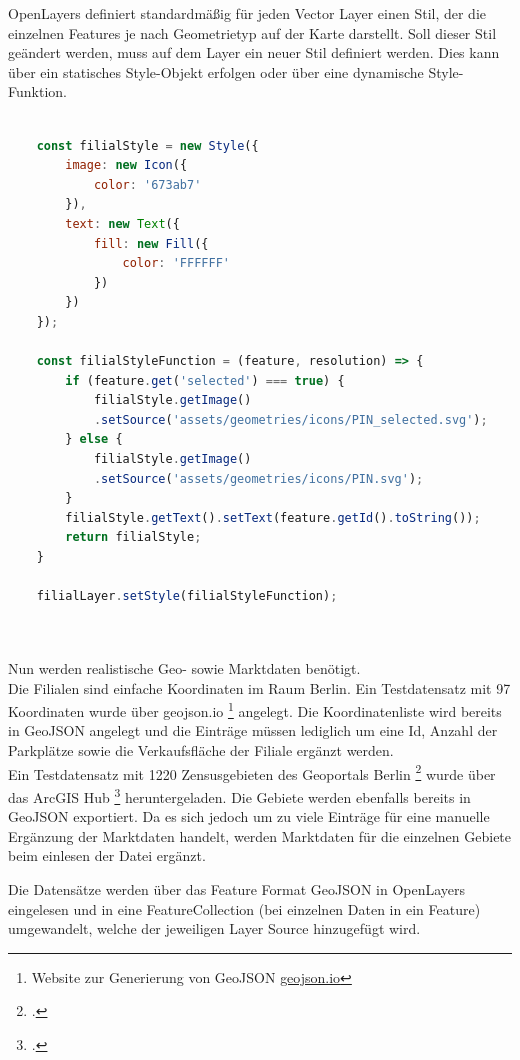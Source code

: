OpenLayers definiert standardmäßig für jeden Vector Layer einen Stil, der die einzelnen Features je nach Geometrietyp auf der Karte darstellt. 
Soll dieser Stil geändert werden, muss auf dem Layer ein neuer Stil definiert werden.
Dies kann über ein statisches Style-Objekt erfolgen oder über eine dynamische Style-Funktion.

\begin{lstlisting}[language=JavaScript, label={code:filialStyle}, caption={Erstellen des Filialstyles}]
	
	const filialStyle = new Style({
		image: new Icon({
			color: '673ab7'
		}),
		text: new Text({
			fill: new Fill({
				color: 'FFFFFF'
			})	
		})
	});
	
	const filialStyleFunction = (feature, resolution) => {
		if (feature.get('selected') === true) {
			filialStyle.getImage()
			.setSource('assets/geometries/icons/PIN_selected.svg');
		} else {
			filialStyle.getImage()
			.setSource('assets/geometries/icons/PIN.svg');
		}
		filialStyle.getText().setText(feature.getId().toString());
		return filialStyle;
	}
	
	filialLayer.setStyle(filialStyleFunction);

	
\end{lstlisting}

Nun werden realistische Geo- sowie Marktdaten benötigt.\\
Die Filialen sind einfache Koordinaten im Raum Berlin.
Ein Testdatensatz mit 97 Koordinaten wurde über geojson.io \footnote{ Website zur Generierung von GeoJSON \href{geojson.io}{geojson.io}} angelegt.
Die Koordinatenliste wird bereits in GeoJSON angelegt und die Einträge müssen lediglich um eine Id, Anzahl der Parkplätze sowie die Verkaufsfläche der Filiale ergänzt werden.\\
Ein Testdatensatz mit 1220 Zensusgebieten des Geoportals Berlin \footcite{geoportal_berlin} wurde über das ArcGIS Hub \footcite{arcgis_verkehrszellen} heruntergeladen.
Die Gebiete werden ebenfalls bereits in GeoJSON exportiert.
Da es sich jedoch um zu viele Einträge für eine manuelle Ergänzung der Marktdaten handelt, werden Marktdaten für die einzelnen Gebiete beim einlesen der Datei ergänzt.

Die Datensätze werden über das Feature Format GeoJSON in OpenLayers eingelesen und in eine FeatureCollection (bei einzelnen Daten in ein Feature) umgewandelt, welche der jeweiligen Layer Source hinzugefügt wird.

